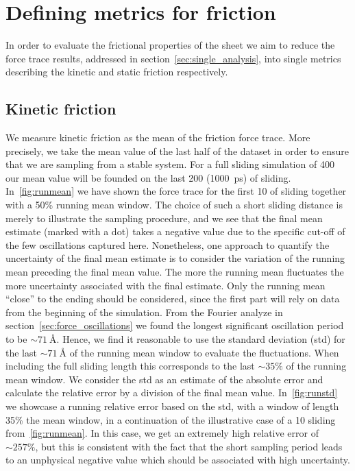 \section{Defining metrics for friction}\label{sec:fric_metrics}
In order to evaluate the frictional properties of the sheet we aim to reduce the force trace results, addressed in section~\cref{sec:single_analysis}, into single metrics describing the kinetic and static friction respectively. 

\subsection{Kinetic friction}
We measure kinetic friction as the mean of the friction force trace. More
precisely, we take the mean value of the last half of the dataset in order to
ensure that we are sampling from a stable system. For a full sliding simulation
of \SI{400}{} our mean value will be founded on the last \SI{200}{}
(\SI{1000}{ps}) of sliding. In~\cref{fig:runmean} we have shown the force trace
for the first \SI{10}{} of sliding together with a 50\% running mean window.
The choice of such a short sliding distance is merely to illustrate the sampling
procedure, and we see that the final mean estimate (marked with a dot) takes a
negative value due to the specific cut-off of the few oscillations captured
here. Nonetheless, one approach to quantify the uncertainty of the final mean
estimate is to consider the variation of the running mean preceding the final
mean value. The more the running mean fluctuates the more uncertainty associated
with the final estimate. Only the running mean ``close'' to the ending should be
considered, since the first part will rely on data from the beginning of the
simulation. From the Fourier analyze in section~\cref{sec:force_oscillations} we
found the longest significant oscillation period to be $\sim \SI{71}{\text{Å}}$.
Hence, we find it reasonable to use the standard deviation (\acrshort{std}) for
the last $\sim \SI{71}{\text{Å}}$ of the running mean window to evaluate the
fluctuations. When including the full sliding length this corresponds to the
last $\sim 35 \%$ of the running mean window. We consider the \acrshort{std} as
an estimate of the absolute error and calculate the relative error by a division
of the final mean value. In~\cref{fig:runstd} we showcase a running relative
error based on the \acrshort{std}, with a window of length 35\% the mean window,
in a continuation of the illustrative case of a \SI{10}{} sliding
from~\cref{fig:runmean}. In this case, we get an extremely high relative error of
$\sim 257\%$, but this is consistent with the fact that the short sampling period leads to an unphysical negative value which should be associated with high uncertainty. 

